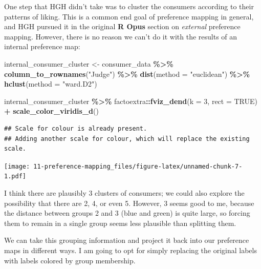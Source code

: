 \documentclass[
]{book}
\newenvironment{Shaded}{\begin{snugshade}}{\end{snugshade}}
\newcommand{\AttributeTok}[1]{\textcolor[rgb]{0.13,0.29,0.53}{#1}}
\newcommand{\ConstantTok}[1]{\textcolor[rgb]{0.56,0.35,0.01}{#1}}
\newcommand{\DecValTok}[1]{\textcolor[rgb]{0.00,0.00,0.81}{#1}}
\newcommand{\FunctionTok}[1]{\textcolor[rgb]{0.13,0.29,0.53}{\textbf{#1}}}
\newcommand{\NormalTok}[1]{#1}
\newcommand{\OtherTok}[1]{\textcolor[rgb]{0.56,0.35,0.01}{#1}}
\newcommand{\SpecialCharTok}[1]{\textcolor[rgb]{0.81,0.36,0.00}{\textbf{#1}}}
\newcommand{\StringTok}[1]{\textcolor[rgb]{0.31,0.60,0.02}{#1}}
\begin{document}
One step that HGH didn't take was to cluster the consumers according to their patterns of liking. This is a common end goal of preference mapping in general, and HGH pursued it in the original \textbf{R Opus} section on \emph{external} preference mapping. However, there is no reason we can't do it with the results of an internal preference map:

\begin{Shaded}
\begin{Highlighting}[]
\NormalTok{internal\_consumer\_cluster }\OtherTok{\textless{}{-}} 
\NormalTok{  consumer\_data }\SpecialCharTok{\%\textgreater{}\%}
  \FunctionTok{column\_to\_rownames}\NormalTok{(}\StringTok{"Judge"}\NormalTok{) }\SpecialCharTok{\%\textgreater{}\%}
  \FunctionTok{dist}\NormalTok{(}\AttributeTok{method =} \StringTok{"euclidean"}\NormalTok{) }\SpecialCharTok{\%\textgreater{}\%}
  \FunctionTok{hclust}\NormalTok{(}\AttributeTok{method =} \StringTok{"ward.D2"}\NormalTok{) }

\NormalTok{internal\_consumer\_cluster }\SpecialCharTok{\%\textgreater{}\%}
\NormalTok{  factoextra}\SpecialCharTok{::}\FunctionTok{fviz\_dend}\NormalTok{(}\AttributeTok{k =} \DecValTok{3}\NormalTok{, }\AttributeTok{rect =} \ConstantTok{TRUE}\NormalTok{) }\SpecialCharTok{+}
  \FunctionTok{scale\_color\_viridis\_d}\NormalTok{()}
\end{Highlighting}
\end{Shaded}

\begin{verbatim}
## Scale for colour is already present.
## Adding another scale for colour, which will replace the existing scale.
\end{verbatim}

\texttt{[image: 11-preference-mapping\_files/figure-latex/unnamed-chunk-7-1.pdf]}

I think there are plausibly 3 clusters of consumers; we could also explore the possibility that there are 2, 4, or even 5. However, 3 seems good to me, because the distance between groups 2 and 3 (blue and green) is quite large, so forcing them to remain in a single group seems less plausible than splitting them.

We can take this grouping information and project it back into our preference maps in different ways. I am going to opt for simply replacing the original labels with labels colored by group membership.
\end{document}
